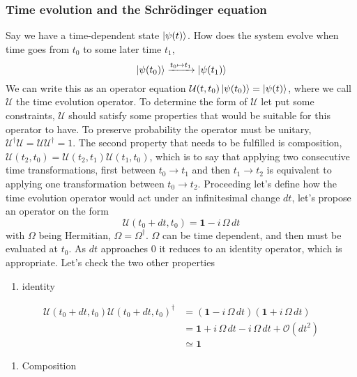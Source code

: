 \subsubsection{Time evolution and the Schrödinger equation}
Say we have a time-dependent state $\ket{\psi(t)}$. How does the system evolve when time goes from $t_0$ to some later time $t_1$, 
\begin{equation}
\ket{\psi(t_0)} \xrightarrow{t_0 \mapsto t_1} \ket{\psi(t_1)} 
\end{equation}
We can write this as an operator equation $\mathcal{U}(t,t_0)\ket{\psi(t_0)} = \ket{\psi(t)}$, where we call $\mathcal{U}$ the time evolution operator. To determine the form of $\mathcal{U}$ let put some constraints, $\mathcal{U}$ should satisfy some properties that would be suitable for this operator to have. To preserve probability the operator must be unitary, $\mathcal{U}^\dagger\mathcal{U} = \mathcal{U}\mathcal{U}^\dagger = 1$.
The second property that needs to be fulfilled is composition, $\mathcal{U}(t_2,t_0) = \mathcal{U}(t_2,t_1)\mathcal{U}(t_1,t_0)$, which is to say that applying two consecutive time transformations, first between $t_0 \rightarrow t_1$ and then $t_1 \rightarrow t_2$ is equivalent to applying one transformation between $t_0 \rightarrow t_2$. 
Proceeding let's define how the time evolution operator would act under an infinitesimal change $dt$, let's propose an operator on the form
\begin{equation}
\mathcal{U}(t_0 +dt, t_0) = \mathbf{1} - i\,\Omega\,dt
\end{equation}
with $\Omega$ being Hermitian, $\Omega = \Omega^\dagger$. $\Omega$ can be time dependent, and then must be evaluated at $t_0$. As $dt$ approaches $0$ it reduces to an identity operator, which is appropriate.
Let's check the two other properties
\begin{enumerate}
\item identity
\end{enumerate}
\begin{equation}
\begin{aligned}
\mathcal{U}(t_0 +dt, t_0)\mathcal{U}(t_0 +dt, t_0)^\dagger &= \left( \mathbf{1} - i\,\Omega\,dt \right)\left(\mathbf{1} + i\,\Omega\,dt \right) \\&= \mathbf{1} + i\,\Omega\,dt - i\,\Omega\,dt + \mathcal{O}(dt^2) \\&\simeq \mathbf{1}
\end{aligned}
\end{equation}
\begin{enumerate}[resume]
\item Composition
\end{enumerate}
